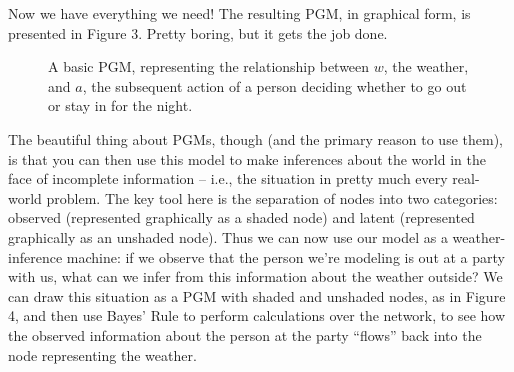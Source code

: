 Now we have everything we need! The resulting PGM, in graphical form, is presented in Figure 3. Pretty boring, but it gets the job done.


\begin{figure}[!ht]
	\centering
	\label{fig:pgm-noshade}
	\caption{A basic PGM, representing the relationship between $w$, the weather, and $a$, the subsequent action of a person deciding whether to go out or stay in for the night.}
\end{figure}

The beautiful thing about PGMs, though (and the primary reason to use them), is that you can then use this model to make inferences about the world in the face of incomplete information -- i.e., the situation in pretty much every real-world problem. The key tool here is the separation of nodes into two categories: observed (represented graphically as a shaded node) and latent (represented graphically as an unshaded node). Thus we can now use our model as a weather-inference machine: if we observe that the person we’re modeling is out at a party with us, what can we infer from this information about the weather outside? We can draw this situation as a PGM with shaded and unshaded nodes, as in Figure 4, and then use Bayes’ Rule to perform calculations over the network, to see how the observed information about the person at the party “flows” back into the node representing the weather.

